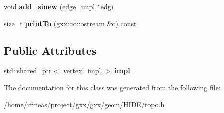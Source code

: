 \begin{DoxyCompactItemize}
\item 
void {\bfseries add\+\_\+sinew} (\hyperlink{classgxx_1_1topo_1_1edge__impl}{edge\+\_\+impl} $\ast$edg)\hypertarget{classgxx_1_1topo_1_1vertex_a15a18815407ae95f6d0dbebb46bac753}{}\label{classgxx_1_1topo_1_1vertex_a15a18815407ae95f6d0dbebb46bac753}

\item 
size\+\_\+t {\bfseries print\+To} (\hyperlink{classgxx_1_1io_1_1ostream}{gxx\+::io\+::ostream} \&o) const \hypertarget{classgxx_1_1topo_1_1vertex_a9185da5800f862d090e692544319006b}{}\label{classgxx_1_1topo_1_1vertex_a9185da5800f862d090e692544319006b}

\end{DoxyCompactItemize}
\subsection*{Public Attributes}
\begin{DoxyCompactItemize}
\item 
std\+::shared\+\_\+ptr$<$ \hyperlink{classgxx_1_1topo_1_1vertex__impl}{vertex\+\_\+impl} $>$ {\bfseries impl}\hypertarget{classgxx_1_1topo_1_1vertex_ac08d5edd8963ac08729b245fd61805c1}{}\label{classgxx_1_1topo_1_1vertex_ac08d5edd8963ac08729b245fd61805c1}

\end{DoxyCompactItemize}


The documentation for this class was generated from the following file\+:\begin{DoxyCompactItemize}
\item 
/home/rfmeas/project/gxx/gxx/geom/\+H\+I\+D\+E/topo.\+h\end{DoxyCompactItemize}
